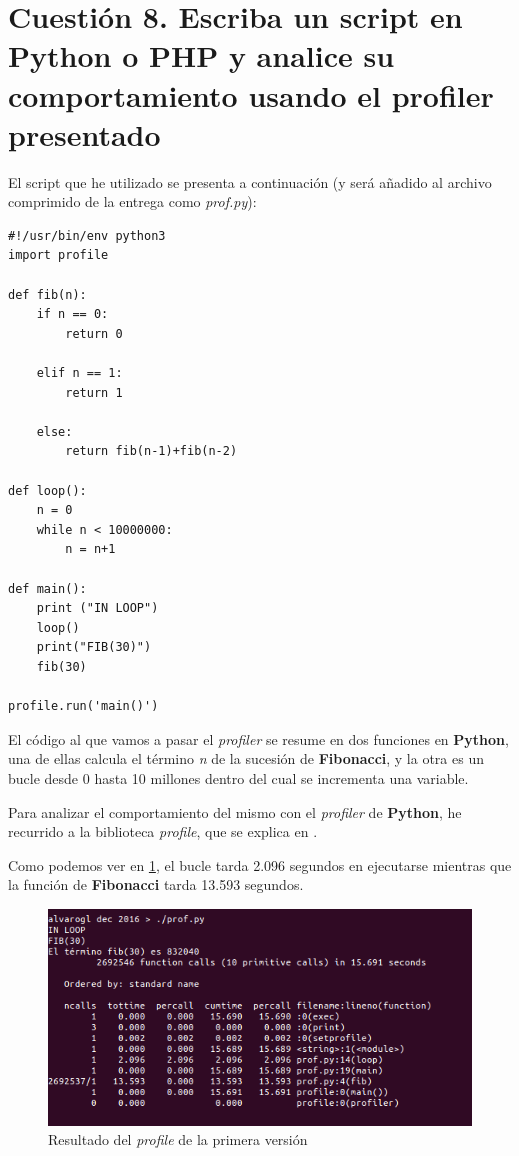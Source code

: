 \section{Cuestión 8. Escriba un script en Python o PHP y analice su comportamiento usando el profiler presentado}

El script que he utilizado se presenta a continuación (y será añadido al archivo comprimido de la entrega como \textit{prof.py}):

\begin{lstlisting}
#!/usr/bin/env python3
import profile

def fib(n):
	if n == 0:
		return 0

	elif n == 1:
		return 1

	else:
		return fib(n-1)+fib(n-2)

def loop():
	n = 0
	while n < 10000000:
		n = n+1

def main():
	print ("IN LOOP")
	loop()
	print("FIB(30)")
	fib(30)

profile.run('main()')
\end{lstlisting}

El código al que vamos a pasar el \textit{profiler} se resume en dos funciones en \textbf{Python}, una de ellas calcula el término \textit{n} de la sucesión de \textbf{Fibonacci}, y la otra es un bucle desde 0 hasta 10 millones dentro del cual se incrementa una variable.

Para analizar el comportamiento del mismo con el \textit{profiler} de \textbf{Python}, he recurrido a la biblioteca \textit{profile}, que se explica en \cite{python}.

Como podemos ver en \ref{cuestion8-profile1}, el bucle tarda 2.096 segundos en ejecutarse mientras que la función de \textbf{Fibonacci} tarda 13.593 segundos.

\begin{figure}[H]
	\centering
	\includegraphics[scale=0.6]{cuestion8-profile1.png}
	\caption{Resultado del \textit{profile} de la primera versión} \label{cuestion8-profile1}
\end{figure}

